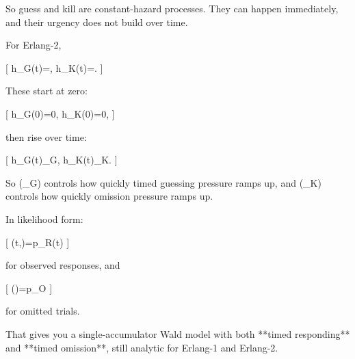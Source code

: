 So guess and kill are constant-hazard processes. They can happen immediately, and their urgency does not build over time.

For Erlang-2,

[
h_G(t)=,
\qquad
h_K(t)=.
]

These start at zero:

[
h_G(0)=0,
\qquad
h_K(0)=0,
]

then rise over time:

[
h_G(t)\to \lambda_G,
\qquad
h_K(t)\to \lambda_K.
]

So (\lambda_G) controls how quickly timed guessing pressure ramps up, and (\lambda_K) controls how quickly omission pressure ramps up.

In likelihood form:

[
\ell(t,)=\log p_R(t)
]

for observed responses, and

[
\ell()=\log p_O
]

for omitted trials.

That gives you a single-accumulator Wald model with both **timed responding** and **timed omission**, still analytic for Erlang-1 and Erlang-2.

